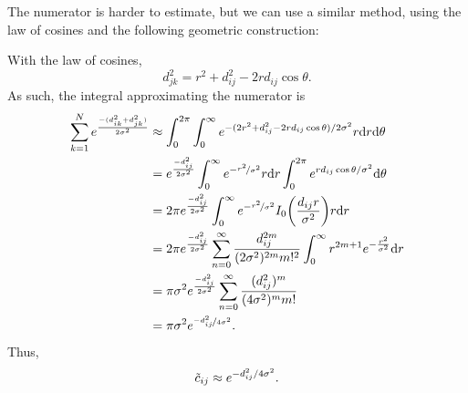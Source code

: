 \documentclass{article}
\begin{document}
The numerator is harder to estimate, but we can use a similar method, using the law of cosines and the following geometric construction:

\begin{center}
\end{center}

With the law of cosines, 
\begin{equation*}
    d_{jk}^2 = r^2+d_{ij}^2-2rd_{ij}\cos\theta.
\end{equation*}
As such, the integral approximating the numerator is
\begin{align*}
    \sum_{k = 1}^N e^{\frac{-(d_{ik}^2+d_{jk}^2)}{2\sigma^2}} &\approx \int_{0}^{2\pi}\int_0^{\infty}e^{-(2r^2+d_{ij}^2-2rd_{ij}\cos\theta)/2\sigma^2}r\dd r\dd \theta\\
    &= e^{\frac{-d_{ij}^2}{2\sigma^2}}\int_0^{\infty}e^{-\nicefrac{r^2}{\sigma^2}}r\dd r\int_{0}^{2\pi}e^{rd_{ij}\cos\theta/\sigma^2}\dd \theta\\
    &= 2\pi e^{\frac{-d_{ij}^2}{2\sigma^2}}\int_0^{\infty}e^{-\nicefrac{r^2}{\sigma^2}}I_0\qty(\frac{d_{ij}r}{\sigma^2})r\dd r\\
    &= 2\pi e^{\frac{-d_{ij}^2}{2\sigma^2}} \sum_{n=0}^\infty \frac{d_{ij}^{2m}}{(2\sigma^2)^{2m} m!^2}\int_0^\infty r^{2m+1} e^{-\frac{r^2}{\sigma^2}} \dd r\\
    &= \pi \sigma^2 e^{\frac{-d_{ij}^2}{2\sigma^2}} \sum_{n=0}^\infty \frac{(d_{ij}^{2})^{m}}{(4\sigma^2)^{m} m!}\\
    &= \pi \sigma^2 e^{\nicefrac{-d_{ij}^2}{4\sigma^2}}.
\end{align*}
Thus,
\begin{align*}
    \Tilde{c}_{ij} \approx e^{-d_{ij}^2/4\sigma^2}.
\end{align*}
\end{document}

